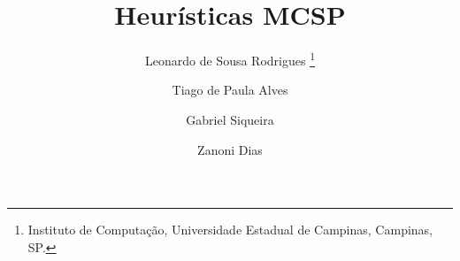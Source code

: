 \documentclass[11pt,twoside]{article}
\begin{document}




    \TRMakeCover


    \pagestyle{myheadings}

    \title{Heurísticas MCSP}

    \author{
        Leonardo de Sousa Rodrigues%
        \thanks{Instituto de Computação, Universidade Estadual de Campinas, Campinas, SP.} 
        \and
        Tiago de Paula Alves\footnotemark[1]
        \and 
        Gabriel Siqueira\footnotemark[1] 
        \and 
        Zanoni Dias\footnotemark[1]
    }

    \date{}

    \maketitle
\end{document}
